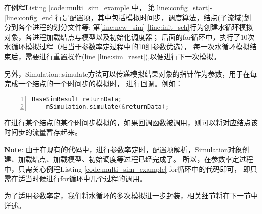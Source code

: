 在例程Listing \ref{code:multi_sim_example}中，
第\ref{line:config_start}-\ref{line:config_end}行是配置项，其中包括模拟时间步，调度算法，结点(子流域)划分到各个进程的划分文件等;
第\ref{line:new_sim}-\ref{line:init_sch}行为创建水循环模拟对象，各进程加载结点与模型以及初始化调度器；
后面的for循环中，执行了10次水循环模拟过程（相当于参数率定过程中的10组参数优选），
每一次水循环模拟结束后，需要进行重置操作(line \ref{line:sim_reset}),以便进行下一次模拟。

另外，Simulation::simulate方法可以传递模拟结果对象的指针作为参数，用于在每完成一个结点的一个时间步的模拟时，
进行回调。例如：
\begin{lstlisting}[caption={模拟过程回调例程},label={code:sim_callback_example},language=c++,numbers=left]
    BaseSimResult returnData;
    mSimulation.simulate(&returnData);
\end{lstlisting}
在进行某个结点的某个时间步模拟的，如果回调函数被调用，则可以将对应结点该时间步的流量暂存起来。

\textbf{Note}: 由于在现有的代码中，进行参数率定时，配置项解析，Simulation对象创建、加载结点、加载模型、初始调度等过程已经完成了。
所以，在参数率定过程中，只需关心例程Listing \ref{code:multi_sim_example} for循环中的代码即可，
即只需在适当时候进行for循环中几个过程的调用。

为了适用参数率定，我们将水循环的多次模拟进一步封装，相关细节将在下一节中详述。